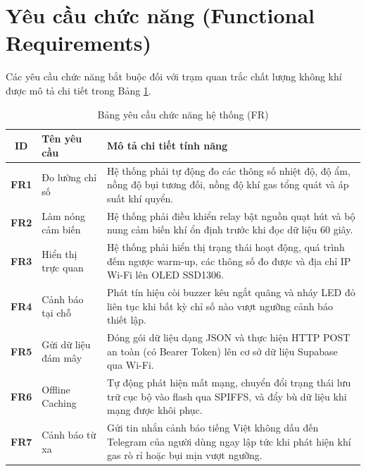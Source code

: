 \section{Yêu cầu chức năng (Functional Requirements)}
Các yêu cầu chức năng bắt buộc đối với trạm quan trắc chất lượng không khí được mô tả chi tiết trong Bảng \ref{tab:functionalreqs}.

\begin{table}[H]
\centering
\caption{Bảng yêu cầu chức năng hệ thống (FR)}
\label{tab:functionalreqs}
\small
\renewcommand{\arraystretch}{1.35}
\setlength{\tabcolsep}{6pt}

\begin{tabularx}{\textwidth}{|c|p{3.2cm}|X|}
\hline
\textbf{ID} & \textbf{Tên yêu cầu} & \textbf{Mô tả chi tiết tính năng} \\
\hline

\textbf{FR1} & Đo lường chỉ số & 
Hệ thống phải tự động đo các thông số nhiệt độ, độ ẩm, nồng độ bụi tương đối, nồng độ khí gas tổng quát và áp suất khí quyển. \\
\hline

\textbf{FR2} & Làm nóng cảm biến & 
Hệ thống phải điều khiển relay bật nguồn quạt hút và bộ nung cảm biến khí ổn định trước khi đọc dữ liệu 60 giây. \\
\hline

\textbf{FR3} & Hiển thị trực quan & 
Hệ thống phải hiển thị trạng thái hoạt động, quá trình đếm ngược warm-up, các thông số đo được và địa chỉ IP Wi-Fi lên OLED SSD1306. \\
\hline

\textbf{FR4} & Cảnh báo tại chỗ & 
Phát tín hiệu còi buzzer kêu ngắt quãng và nháy LED đỏ liên tục khi bất kỳ chỉ số nào vượt ngưỡng cảnh báo thiết lập. \\
\hline

\textbf{FR5} & Gửi dữ liệu đám mây & 
Đóng gói dữ liệu dạng JSON và thực hiện HTTP POST an toàn (có Bearer Token) lên cơ sở dữ liệu Supabase qua Wi-Fi. \\
\hline

\textbf{FR6} & Offline Caching & 
Tự động phát hiện mất mạng, chuyển đổi trạng thái lưu trữ cục bộ vào flash qua SPIFFS, và đẩy bù dữ liệu khi mạng được khôi phục. \\
\hline

\textbf{FR7} & Cảnh báo từ xa & 
Gửi tin nhắn cảnh báo tiếng Việt không dấu đến Telegram của người dùng ngay lập tức khi phát hiện khí gas rò rỉ hoặc bụi mịn vượt ngưỡng. \\
\hline

\end{tabularx}
\end{table}

